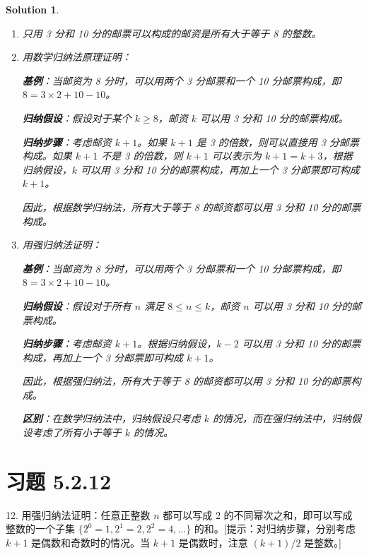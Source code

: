 \documentclass[UTF8]{report}
\newtheorem{solution}{Solution}
\theoremstyle{MyLineTheoremStyle} %
\theoremstyle{MyBlockTheoremStyle} %
\theoremstyle{MySubsubsectionStyle} %
\begin{document}
\begin{solution}
    \begin{enumerate}
        \item 只用 3 分和 10 分的邮票可以构成的邮资是所有大于等于 8 的整数。
        
        \item 用数学归纳法原理证明：
        
        \textbf{基例}：当邮资为 8 分时，可以用两个 3 分邮票和一个 10 分邮票构成，即 \( 8 = 3 \times 2 + 10 - 10 \)。
        
        \textbf{归纳假设}：假设对于某个 \( k \geq 8 \)，邮资 \( k \) 可以用 3 分和 10 分的邮票构成。
        
        \textbf{归纳步骤}：考虑邮资 \( k+1 \)。如果 \( k+1 \) 是 3 的倍数，则可以直接用 3 分邮票构成。如果 \( k+1 \) 不是 3 的倍数，则 \( k+1 \) 可以表示为 \( k+1 = k + 3 \)，根据归纳假设，\( k \) 可以用 3 分和 10 分的邮票构成，再加上一个 3 分邮票即可构成 \( k+1 \)。
        
        因此，根据数学归纳法，所有大于等于 8 的邮资都可以用 3 分和 10 分的邮票构成。
        
        \item 用强归纳法证明：
        
        \textbf{基例}：当邮资为 8 分时，可以用两个 3 分邮票和一个 10 分邮票构成，即 \( 8 = 3 \times 2 + 10 - 10 \)。
        
        \textbf{归纳假设}：假设对于所有 \( n \) 满足 \( 8 \leq n \leq k \)，邮资 \( n \) 可以用 3 分和 10 分的邮票构成。
        
        \textbf{归纳步骤}：考虑邮资 \( k+1 \)。根据归纳假设，\( k-2 \) 可以用 3 分和 10 分的邮票构成，再加上一个 3 分邮票即可构成 \( k+1 \)。
        
        因此，根据强归纳法，所有大于等于 8 的邮资都可以用 3 分和 10 分的邮票构成。
        
        \textbf{区别}：在数学归纳法中，归纳假设只考虑 \( k \) 的情况，而在强归纳法中，归纳假设考虑了所有小于等于 \( k \) 的情况。
    \end{enumerate}
\end{solution}

\section{习题 5.2.12}
12. 用强归纳法证明：任意正整数 $n$ 都可以写成 2 的不同幂次之和，即可以写成整数的一个子集 $\{2^0=1, 2^1=2, 2^2=4, \ldots\}$ 的和。[提示：对归纳步骤，分别考虑 $k+1$ 是偶数和奇数时的情况。当 $k+1$ 是偶数时，注意 $(k+1)/2$ 是整数。]
\end{document}
